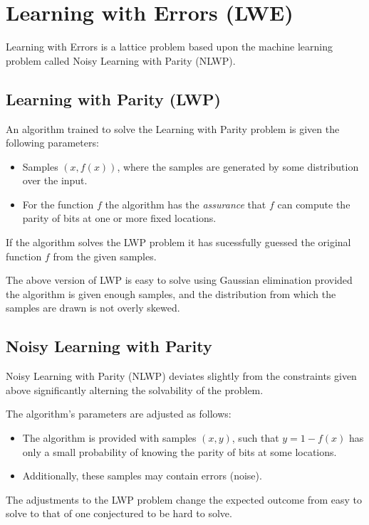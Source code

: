 \section{Learning with Errors (LWE)}

Learning with Errors is a lattice problem based upon the machine learning problem called Noisy Learning with Parity (NLWP). 

\subsection{Learning with Parity (LWP)}

An algorithm trained to solve the Learning with Parity problem is given the following parameters:
\begin{itemize}
	\item Samples $(x, f(x))$, where the samples are generated by some distribution over the input.
	\item For the function $f$ the algorithm has the \emph{assurance} that $f$ can compute the parity of bits at one or more fixed locations.
\end{itemize}

If the algorithm solves the LWP problem it has sucessfully guessed the original function $f$ from the given samples.

The above version of LWP is easy to solve using Gaussian elimination provided the algorithm is given enough samples, and the distribution from which the samples are drawn is not overly skewed. 

\subsection{Noisy Learning with Parity}

Noisy Learning with Parity (NLWP) deviates slightly from the constraints given above significantly alterning the solvability of the problem. 

The algorithm's parameters are adjusted as follows:
\begin{itemize}
	\item The algorithm is provided with samples $(x,y)$, such that $y = 1- f(x)$ has only a small probability of knowing the parity of bits at some locations. 
	\item Additionally, these samples may contain errors (noise).
\end{itemize}

The adjustments to the LWP problem change the expected outcome from easy to solve to that of one conjectured to be hard to solve. 
